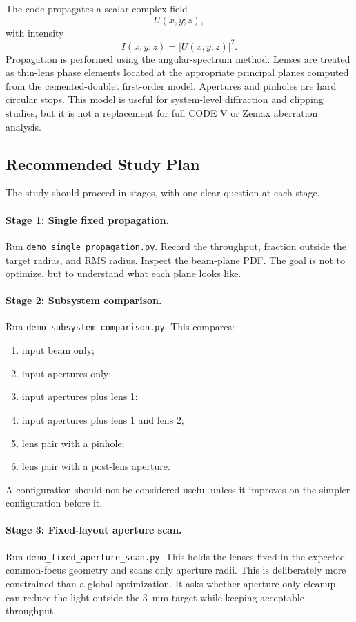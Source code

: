 The code propagates a scalar complex field
\[
    U(x,y;z),
\]
with intensity
\[
    I(x,y;z)=|U(x,y;z)|^2.
\]
Propagation is performed using the angular-spectrum method. Lenses are treated
as thin-lens phase elements located at the appropriate principal planes computed
from the cemented-doublet first-order model. Apertures and pinholes are hard
circular stops. This model is useful for system-level diffraction and clipping
studies, but it is not a replacement for full CODE V or Zemax aberration
analysis.

\subsection{Recommended Study Plan}

The study should proceed in stages, with one clear question at each stage.

\paragraph{Stage 1: Single fixed propagation.}
Run \texttt{demo\_single\_propagation.py}. Record the throughput, fraction
outside the target radius, and RMS radius. Inspect the beam-plane PDF. The goal
is not to optimize, but to understand what each plane looks like.

\paragraph{Stage 2: Subsystem comparison.}
Run \texttt{demo\_subsystem\_comparison.py}. This compares:
\begin{enumerate}
    \item input beam only;
    \item input apertures only;
    \item input apertures plus lens 1;
    \item input apertures plus lens 1 and lens 2;
    \item lens pair with a pinhole;
    \item lens pair with a post-lens aperture.
\end{enumerate}
A configuration should not be considered useful unless it improves on the simpler
configuration before it.

\paragraph{Stage 3: Fixed-layout aperture scan.}
Run \texttt{demo\_fixed\_aperture\_scan.py}. This holds the lenses fixed in the
expected common-focus geometry and scans only aperture radii. This is deliberately
more constrained than a global optimization. It asks whether aperture-only cleanup
can reduce the light outside the \SI{3}{mm} target while keeping acceptable
throughput.


